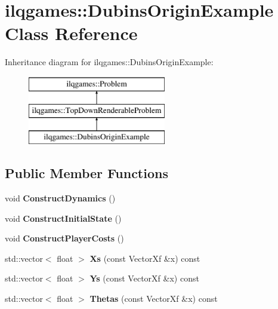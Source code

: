 \hypertarget{classilqgames_1_1_dubins_origin_example}{}\section{ilqgames\+:\+:Dubins\+Origin\+Example Class Reference}
\label{classilqgames_1_1_dubins_origin_example}
Inheritance diagram for ilqgames\+:\+:Dubins\+Origin\+Example\+:\begin{figure}[H]
\begin{center}
\leavevmode
\includegraphics[height=3.000000cm]{classilqgames_1_1_dubins_origin_example}
\end{center}
\end{figure}
\subsection*{Public Member Functions}
\begin{DoxyCompactItemize}
\item 
void {\bfseries Construct\+Dynamics} ()\hypertarget{classilqgames_1_1_dubins_origin_example_a7e7c6f070e3d3d8c2146c7dd2940fa8b}{}\label{classilqgames_1_1_dubins_origin_example_a7e7c6f070e3d3d8c2146c7dd2940fa8b}

\item 
void {\bfseries Construct\+Initial\+State} ()\hypertarget{classilqgames_1_1_dubins_origin_example_abddd656d0a183f6ee064dd4a2e1274a9}{}\label{classilqgames_1_1_dubins_origin_example_abddd656d0a183f6ee064dd4a2e1274a9}

\item 
void {\bfseries Construct\+Player\+Costs} ()\hypertarget{classilqgames_1_1_dubins_origin_example_a634c9d563ae35f524ebdbac9b137a7e0}{}\label{classilqgames_1_1_dubins_origin_example_a634c9d563ae35f524ebdbac9b137a7e0}

\item 
std\+::vector$<$ float $>$ {\bfseries Xs} (const Vector\+Xf \&x) const \hypertarget{classilqgames_1_1_dubins_origin_example_a29910b6c91478b66b64765ce418f5846}{}\label{classilqgames_1_1_dubins_origin_example_a29910b6c91478b66b64765ce418f5846}

\item 
std\+::vector$<$ float $>$ {\bfseries Ys} (const Vector\+Xf \&x) const \hypertarget{classilqgames_1_1_dubins_origin_example_a993f76e0d7549d37973a258c2b78a962}{}\label{classilqgames_1_1_dubins_origin_example_a993f76e0d7549d37973a258c2b78a962}

\item 
std\+::vector$<$ float $>$ {\bfseries Thetas} (const Vector\+Xf \&x) const \hypertarget{classilqgames_1_1_dubins_origin_example_a650be123b88df2bc4fa9c137810b1d6d}{}\label{classilqgames_1_1_dubins_origin_example_a650be123b88df2bc4fa9c137810b1d6d}

\end{DoxyCompactItemize}

